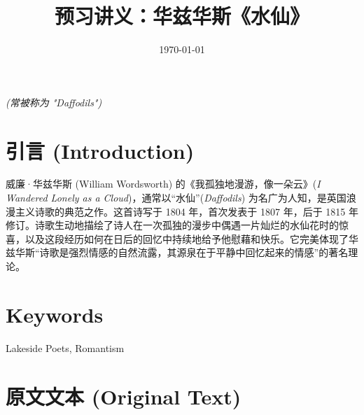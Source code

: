 \documentclass[12pt, a4paper]{article}
\title{\textbf{预习讲义：华兹华斯《水仙》}}
\date{\today}
\begin{document}
\maketitle
\begin{center}
    \textit{(常被称为 "Daffodils")}
\end{center}

\section{引言 (Introduction)}

威廉·华兹华斯 (William Wordsworth) 的《我孤独地漫游，像一朵云》(\textit{I Wandered Lonely as a Cloud})，通常以“水仙”(\textit{Daffodils}) 为名广为人知，是英国浪漫主义诗歌的典范之作。这首诗写于 1804 年，首次发表于 1807 年，后于 1815 年修订。诗歌生动地描绘了诗人在一次孤独的漫步中偶遇一片灿烂的水仙花时的惊喜，以及这段经历如何在日后的回忆中持续地给予他慰藉和快乐。它完美体现了华兹华斯“诗歌是强烈情感的自然流露，其源泉在于平静中回忆起来的情感”的著名理论。
\section{Keywords}
Lakeside Poets, Romantism
\section{原文文本 (Original Text)}
\end{document}
